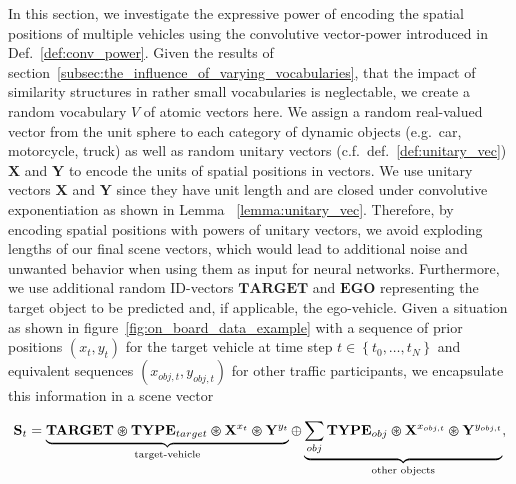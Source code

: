 In this section, we investigate the expressive power of encoding the spatial positions of multiple vehicles using the convolutive vector-power introduced in Def.~\ref{def:conv_power}.
Given the results of section~\ref{subsec:the_influence_of_varying_vocabularies}, that the impact of similarity structures in rather small vocabularies is neglectable, we create a random vocabulary $V$ of atomic vectors here.
We assign a random real-valued vector from the unit sphere to each category of dynamic objects (e.g.\ car, motorcycle, truck) as well as random unitary vectors (c.f.\ def.~\ref{def:unitary_vec}) $\mathbf{X}$ and $\mathbf{Y}$ to encode the units of spatial positions in vectors.
We use unitary vectors $\mathbf{X}$ and $\mathbf{Y}$ since they have unit length and are closed under convolutive exponentiation as shown in Lemma ~\ref{lemma:unitary_vec}.
Therefore, by encoding spatial positions with powers of unitary vectors, we avoid exploding lengths of our final scene vectors, which would lead to additional noise and unwanted behavior when using them as input for neural networks.
Furthermore, we use additional random ID-vectors $\mathbf{TARGET}$ and $\mathbf{EGO}$ representing the target object to be predicted and, if applicable, the ego-vehicle.
Given a situation as shown in figure~\ref{fig:on_board_data_example} with a sequence of prior positions $(x_{t}, y_{t})$ for the target vehicle at time step $t \in \left\{t_{0}, \ldots, t_{N} \right\}$ and equivalent sequences $(x_{obj,t}, y_{obj,t})$ for other traffic participants, we encapsulate this information in a scene vector

\begin{equation}
	\label{eq:conv_power_enc}
  \mathbf{S}_{t} = \underbrace{\mathbf{TARGET}\varoast \mathbf{TYPE}_{target} \varoast \mathbf{X}^{x_{t}} \varoast \mathbf{Y}^{y_{t}}}_{\textrm{target-vehicle}} \oplus \underbrace{\sum_{obj} \mathbf{TYPE}_{obj} \varoast \mathbf{X}^{x_{obj,t}} \varoast \mathbf{Y}^{y_{obj,t}}}_{\textrm{other objects}},
\end{equation}

